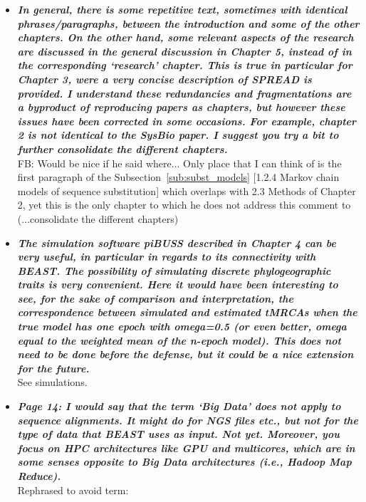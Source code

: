 \documentclass[english]{article}
\begin{document}
\begin{itemize}
\item {
{\it
\textbf{
In general, there is some repetitive text, sometimes with identical phrases/paragraphs, between the introduction and some of the other chapters. 
On the other hand, some relevant aspects of the research are discussed in the general discussion in Chapter 5, instead of in the corresponding `research' chapter. 
This is true in particular for Chapter 3, were a very concise description of SPREAD is provided. 
I understand these redundancies and fragmentations are a byproduct of reproducing papers as chapters, but however these issues have been corrected in some occasions. 
For example, chapter 2 is not identical to the SysBio paper. 
I suggest you try a bit to further consolidate the different chapters.
}%
}%
}%
\\
FB: Would be nice if he said where... Only place that I can think of is the first paragraph of the Subsection~\ref{sub:subst_models}  [1.2.4 Markov chain models of sequence substitution] which overlaps with 2.3 Methods of Chapter 2, yet this is the only chapter to which he does not address this comment to (...consolidate the different chapters)



\item {
{\it
\textbf{
The simulation software piBUSS described in Chapter 4 can be very useful, in particular in regards to its connectivity with BEAST. 
The possibility of simulating discrete phylogeographic traits is very convenient. 
Here it would have been interesting to see, for the sake of comparison and interpretation, the correspondence between simulated and estimated tMRCAs when the true model has one epoch with omega=0.5 (or even better, omega equal to the weighted mean of the n-epoch model). 
This does not need to be done before the defense, but it could be a nice extension for the future.
}%
}%
}%
\\
See simulations.


\item {
{\it
\textbf{
Page 14: I would say that the term `Big Data' does not apply to sequence alignments. 
It might do for NGS files etc., but not for the type of data that BEAST uses as input. 
Not yet. 
Moreover, you focus on HPC architectures like GPU and multicores, which are in some senses opposite to Big Data architectures (i.e., Hadoop Map Reduce).
}%
}%
}%
\\
Rephrased to avoid term:


\end{itemize}
\end{document}
